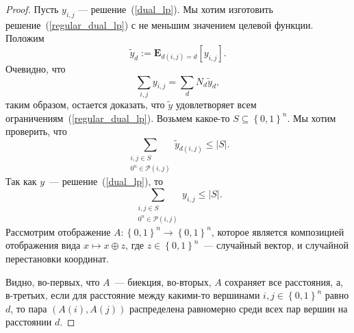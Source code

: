 \documentclass[12pt]{article}
\newcommand{\set}[1]{\left\{#1\right\}}
\newcommand{\abs}[1]{\left|#1\right|}
\newcommand{\zo}{\set{0, 1}}
\newcommand{\Pc}{\mathcal{P}}
\newcommand{\Exp}[2]{\mathbf{E}_{#1}\left[#2\right]}
\begin{document}
    \begin{proof}
        Пусть $y_{i,j}$ --- решение~(\ref{dual_lp}). Мы хотим изготовить решение~(\ref{regular_dual_lp}) с не меньшим значением целевой функции.
        Положим
        $$
            \tilde{y}_d := \Exp{d(i, j) = d}{y_{i,j}}.
        $$
        Очевидно, что
        $$
            \sum_{i,j}y_{i,j} = \sum_d N_d \tilde{y}_d,
        $$
        таким образом, остается доказать, что $\tilde{y}$ удовлетворяет
        всем ограничениям~(\ref{regular_dual_lp}).
        Возьмем какое-то $S \subseteq \zo^n$. Мы хотим проверить, что
        \begin{equation}
            \label{regular_constraint}
            \sum_{\begin{smallmatrix}i, j \in S \\ 0^n \in \Pc(i, j)\end{smallmatrix}}
            \tilde{y}_{d(i, j)} \leq \abs{S}.
        \end{equation}
        Так как $y$~--- решение~(\ref{dual_lp}), то 
        $$
            \sum_{\begin{smallmatrix}i, j \in S \\ 0^n \in \Pc(i, j)\end{smallmatrix}}
            y_{i, j} \leq \abs{S}.
        $$
        Рассмотрим отображение $A \colon \zo^n \to \zo^n$, которое является композицией отображения вида $x \mapsto x \oplus z$, где $z \in \zo^n$~--- случайный вектор,
        и случайной перестановки координат.

        Видно, во-первых, что $A$~--- биекция, во-вторых, $A$ сохраняет
        все расстояния,
        а, в-третьих, если для расстояние между какими-то вершинами $i, j \in \zo^n$
        равно $d$, то пара $(A(i), A(j))$ распределена равномерно среди всех пар
        вершин на расстоянии $d$.


\end{proof}
\end{document}
